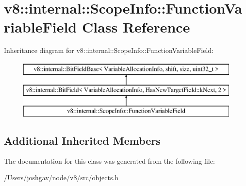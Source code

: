 \hypertarget{classv8_1_1internal_1_1_scope_info_1_1_function_variable_field}{}\section{v8\+:\+:internal\+:\+:Scope\+Info\+:\+:Function\+Variable\+Field Class Reference}
\label{classv8_1_1internal_1_1_scope_info_1_1_function_variable_field}
Inheritance diagram for v8\+:\+:internal\+:\+:Scope\+Info\+:\+:Function\+Variable\+Field\+:\begin{figure}[H]
\begin{center}
\leavevmode
\includegraphics[height=3.000000cm]{classv8_1_1internal_1_1_scope_info_1_1_function_variable_field}
\end{center}
\end{figure}
\subsection*{Additional Inherited Members}


The documentation for this class was generated from the following file\+:\begin{DoxyCompactItemize}
\item 
/\+Users/joshgav/node/v8/src/objects.\+h\end{DoxyCompactItemize}

